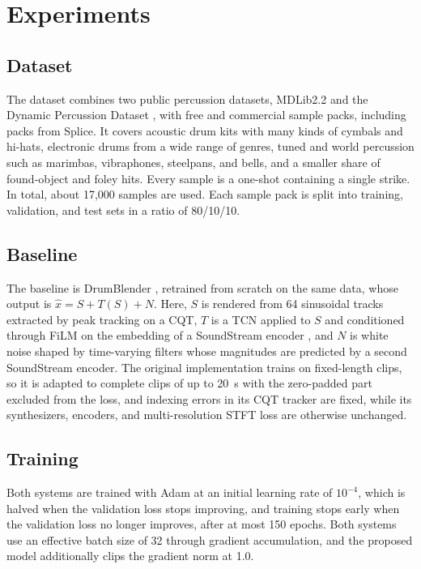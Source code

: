\section{Experiments}
\label{sec:experiments}

\subsection{Dataset}
\label{sec:exp-data}
The dataset combines two public percussion datasets, MDLib2.2 \citep{prockup2013toward} and the Dynamic Percussion Dataset \citep{nieminen2020dynamic}, with free and commercial sample packs, including packs from Splice.
It covers acoustic drum kits with many kinds of cymbals and hi-hats, electronic drums from a wide range of genres, tuned and world percussion such as marimbas, vibraphones, steelpans, and bells, and a smaller share of found-object and foley hits.
Every sample is a one-shot containing a single strike.
In total, about 17,000 samples are used.
Each sample pack is split into training, validation, and test sets in a ratio of 80/10/10.

\subsection{Baseline}
\label{sec:exp-baseline}
The baseline is DrumBlender \citep{shier2023differentiable}, retrained from scratch on the same data, whose output is $\hat{x} = S + T(S) + N$.
Here, $S$ is rendered from 64 sinusoidal tracks extracted by peak tracking on a CQT, $T$ is a TCN applied to $S$ and conditioned through FiLM on the embedding of a SoundStream encoder \citep{zeghidour2022soundstream}, and $N$ is white noise shaped by time-varying filters whose magnitudes are predicted by a second SoundStream encoder.
The original implementation trains on fixed-length clips, so it is adapted to complete clips of up to 20~s with the zero-padded part excluded from the loss, and indexing errors in its CQT tracker are fixed, while its synthesizers, encoders, and multi-resolution STFT loss are otherwise unchanged.

\subsection{Training}
\label{sec:exp-train}
Both systems are trained with Adam \citep{kingma2015adam} at an initial learning rate of $10^{-4}$, which is halved when the validation loss stops improving, and training stops early when the validation loss no longer improves, after at most 150 epochs.
Both systems use an effective batch size of 32 through gradient accumulation, and the proposed model additionally clips the gradient norm at 1.0.

